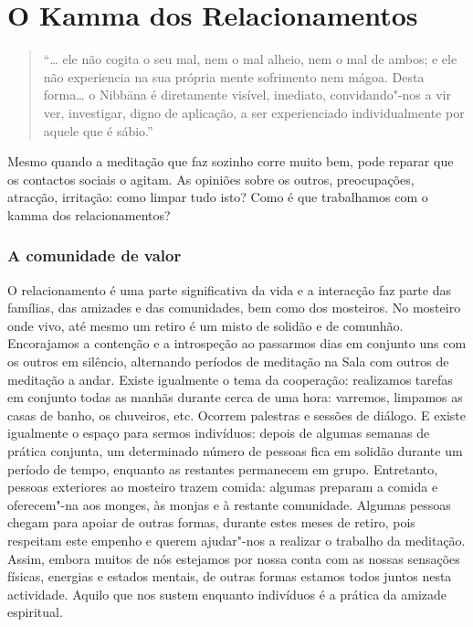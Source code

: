 
\chapter{O Kamma dos Relacionamentos}


\begin{quote}
  ``\ldots{} ele não cogita o seu mal, nem o mal alheio, nem o mal de ambos; e
  ele não experiencia na sua própria mente sofrimento nem mágoa. Desta
  forma\ldots{} o Nibbāna é diretamente visível, imediato, convidando"-nos a vir
  ver, investigar, digno de aplicação, a ser experienciado individualmente por
  aquele que é sábio.''

\end{quote}

Mesmo quando a meditação que faz sozinho corre muito bem, pode reparar que os
contactos sociais o agitam. As opiniões sobre os outros, preocupações, atracção,
irritação: como limpar tudo isto? Como é que trabalhamos com o kamma dos
relacionamentos?

\subsection{A comunidade de valor}

O relacionamento é uma parte significativa da vida e a interacção faz parte das
famílias, das amizades e das comunidades, bem como dos mosteiros. No mosteiro
onde vivo, até mesmo um retiro é um misto de solidão e de comunhão. Encorajamos
a contenção e a introspeção ao passarmos dias em conjunto uns com os outros em
silêncio, alternando períodos de meditação na Sala com outros de meditação a
andar. Existe igualmente o tema da cooperação: realizamos tarefas em conjunto
todas as manhãs durante cerca de uma hora: varremos, limpamos as casas de banho,
os chuveiros, etc. Ocorrem palestras e sessões de diálogo. E existe igualmente o
espaço para sermos indivíduos: depois de algumas semanas de prática conjunta, um
determinado número de pessoas fica em solidão durante um período de tempo,
enquanto as restantes permanecem em grupo. Entretanto, pessoas exteriores ao
mosteiro trazem comida: algumas preparam a comida e oferecem"-na aos monges, às
monjas e à restante comunidade. Algumas pessoas chegam para apoiar de outras
formas, durante estes meses de retiro, pois respeitam este empenho e querem
ajudar"-nos a realizar o trabalho da meditação. Assim, embora muitos de nós
estejamos por nossa conta com as nossas sensações físicas, energias e estados
mentais, de outras formas estamos todos juntos nesta actividade. Aquilo que nos
sustem enquanto indivíduos é a prática da amizade espiritual.

